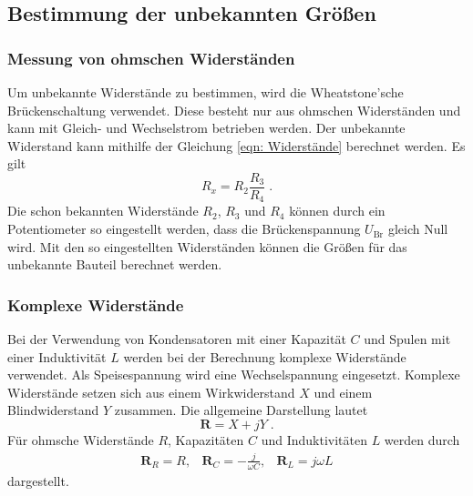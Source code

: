 \subsection{Bestimmung der unbekannten Größen}

    \subsubsection{Messung von ohmschen Widerständen}

        Um unbekannte Widerstände zu bestimmen, wird die Wheatstone'sche Brückenschaltung verwendet.
        Diese besteht nur aus ohmschen Widerständen und kann mit Gleich- und Wechselstrom betrieben werden.
        Der unbekannte Widerstand kann mithilfe der Gleichung \eqref{eqn: Widerstände} berechnet werden.
        Es gilt
        \begin{equation}
            R_x = R_2 \frac{R_3}{R_4} \; . \label{eqn: Rx}
        \end{equation}
        Die schon bekannten Widerstände $R_2$, $R_3$ und $R_4$ können durch ein Potentiometer so eingestellt werden,
        dass die Brückenspannung $U_\text{Br}$ gleich Null wird.
        Mit den so eingestellten Widerständen können die Größen für das unbekannte Bauteil berechnet werden.

    \subsubsection{Komplexe Widerstände}

        Bei der Verwendung von Kondensatoren mit einer Kapazität $C$ und Spulen mit einer Induktivität $L$ werden bei der Berechnung
        komplexe Widerstände verwendet. Als Speisespannung wird eine Wechselspannung eingesetzt.
        Komplexe Widerstände setzen sich aus einem Wirkwiderstand $X$ und einem Blindwiderstand $Y$ zusammen.
        Die allgemeine Darstellung lautet
        \begin{equation}
            \symbf{R} = X + jY \; .
        \end{equation}
        Für ohmsche Widerstände $R$, Kapazitäten $C$ und Induktivitäten $L$ werden durch
        \begin{align}
            \symbf{R}_R = R, & \symbf{R}_C = - \frac{j}{\omega C}, & \symbf{R}_L = j \omega L
        \end{align}
        dargestellt.

